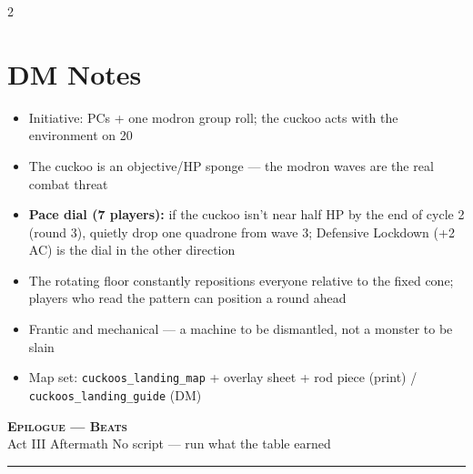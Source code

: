 \documentclass[10pt,letterpaper]{article}
\newcommand{\sceneheader}[4]{%
  \fancyhead[L]{\small\textcolor{accent}{\scshape #1}}%
  \fancyhead[R]{\small\textcolor{accent}{#2 \quad \textbullet \quad #3}}%
  \begin{center}
  {\LARGE\bfseries\scshape\textcolor{accent}{#1}}\\[2pt]
  {\small #2 \quad \textbullet \quad #3 \quad \textbullet \quad #4}\\[2pt]
  \textcolor{rulecol}{\rule{0.5\textwidth}{0.8pt}}
  \end{center}
  \vspace{-4pt}
}
\begin{document}
\begin{multicols}{2}
\section*{DM Notes}
\begin{itemize}
\item Initiative: PCs + one modron group roll; the cuckoo acts with the environment on 20
\item The cuckoo is an objective/HP sponge --- the modron waves are the real combat threat
\item \textbf{Pace dial (7 players):} if the cuckoo isn't near half HP by the end of cycle 2 (round 3), quietly drop one quadrone from wave 3; Defensive Lockdown (+2 AC) is the dial in the other direction
\item The rotating floor constantly repositions everyone relative to the fixed cone; players who read the pattern can position a round ahead
\item Frantic and mechanical --- a machine to be dismantled, not a monster to be slain
\item Map set: \texttt{cuckoos\_landing\_map} + overlay sheet + rod piece (print) / \texttt{cuckoos\_landing\_guide} (DM)
\end{itemize}

\end{multicols}

\newpage



\label{sec:epilogue}\sceneheader{Epilogue --- Beats}{Act III}{Aftermath}{No script --- run what the table earned}
\end{document}
